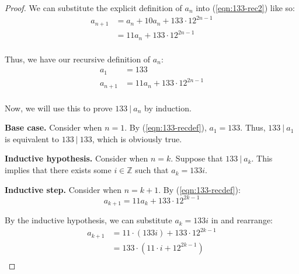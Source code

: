 \documentclass{article}
\numberwithin{subcase}{case}
\begin{document}
\begin{outline}[enumerate]
\begin{proof}
        We can substitute the explicit definition of $a_n$ into (\ref{eqn:133-rec2}) like so:
        \begin{equation}
            \begin{aligned}
                a_{n+1}&= a_n + 10 a_n + 133\cdot 12^{2n-1}\\
                &= 11 a_n + 133\cdot 12^{2n-1}\\
            \end{aligned}
            \label{eqn:133-rec3}
        \end{equation} 

        Thus, we have our recursive definition of $a_n$:
        \begin{equation}
            \begin{aligned}
                a_1 &= 133 \\ 
                a_{n+1} &= 11 a_n + 133\cdot 12^{2n-1}\\
            \end{aligned}
            \label{eqn:133-recdef}
        \end{equation}

        Now, we will use this to prove $133\ |\ a_n$ by induction.

        \textbf{Base case.} Consider when $n = 1$. By (\ref{eqn:133-recdef}), $a_1 = 133$. Thus, 
        $133\ |\ a_1$ is equivalent to $133\ |\ 133$, which is obviously true.

        \textbf{Inductive hypothesis.} Consider when $n = k$. Suppose that $133\ |\ a_k$. This implies 
        that there exists some $i \in \mathbb{Z}$ such that $a_k = 133i$.

        \textbf{Inductive step.} Consider when $n = k + 1$. By (\ref{eqn:133-recdef}):
        \begin{equation}
            a_{k+1} = 11 a_k + 133\cdot 12^{2k-1}
        \end{equation}

        By the inductive hypothesis, we can substitute $a_k = 133i$ in and rearrange:
        \begin{equation}
            \begin{aligned}
                a_{k+1} &= 11 \cdot (133i) + 133\cdot 12^{2k-1} \\
                &= 133\cdot\left(11 \cdot i + 12^{2k-1}\right) \\
            \end{aligned}
        \end{equation}


\end{proof}
\end{outline}
\end{document}

